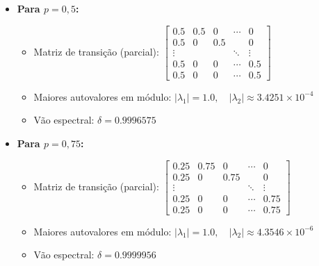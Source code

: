 \begin{enumerate}
\begin{resposta}
\begin{itemize}
            \item \textbf{Para $p = 0{,}5$:}
            \begin{itemize}
                \item Matriz de transição (parcial):
                $
                \begin{bmatrix}
                0.5 & 0.5 & 0    & \cdots & 0 \\
                0.5 & 0   & 0.5  &        & 0 \\
                \vdots &     &     & \ddots & \vdots \\
                0.5 & 0   & 0    & \cdots & 0.5 \\
                0.5 & 0   & 0    & \cdots & 0.5
                \end{bmatrix}
                $
                \item Maiores autovalores em módulo:
                $ |\lambda_1| = 1.0, \quad |\lambda_2| \approx 3.4251 \times 10^{-4} $
                \item Vão espectral:
                $ \boxed{\delta = 0.9996575} $
            \end{itemize}
        
            \item \textbf{Para $p = 0{,}75$:}
            \begin{itemize}
                \item Matriz de transição (parcial):
                $
                \begin{bmatrix}
                0.25 & 0.75 & 0    & \cdots & 0 \\
                0.25 & 0    & 0.75 &        & 0 \\
                \vdots &     &     & \ddots & \vdots \\
                0.25 & 0    & 0    & \cdots & 0.75 \\
                0.25 & 0    & 0    & \cdots & 0.75
                \end{bmatrix}
                $
                \item Maiores autovalores em módulo:
                $ |\lambda_1| = 1.0, \quad |\lambda_2| \approx 4.3546 \times 10^{-6} $
                \item Vão espectral:
                $ \boxed{\delta = 0.9999956} $
            \end{itemize}
        \end{itemize}
        



\end{resposta}
\end{enumerate}
